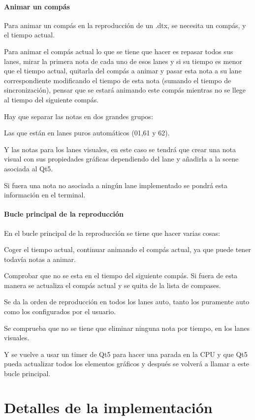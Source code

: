 \documentclass[a4paper,11pt,oneside]{book}
\begin{document}
\subsubsection{Animar un compás}
Para animar un compás en la reproducción de un .dtx, se necesita un compás, y el tiempo actual.

Para animar el compás actual lo que se tiene que hacer es repasar todos sus lanes, mirar la primera nota de cada uno de esos lanes y si su tiempo es menor que el tiempo actual, quitarla del compás a animar y pasar esta nota a su lane correspondiente modificando el tiempo de esta nota (sumando el tiempo de sincronización), pensar que se estará animando este compás mientras no se llege al tiempo del siguiente compás.

Hay que separar las notas en dos grandes grupos:

Las que están en lanes puros automáticos (01,61 y 62).

Y las notas para los lanes visuales, en este caso se tendrá que crear una nota visual con sus propiedades gráficas dependiendo del lane y añadirla a la scene asociada al Qt5.

Si fuera una nota no asociada a ningún lane implementado se pondrá esta información en el terminal.

\subsubsection{Bucle principal de la reproducción}
En el bucle principal de la reproducción se tiene que hacer varias cosas:

Coger el tiempo actual, continuar animando el compás actual, ya que puede tener todavía notas a animar.

Comprobar que no se esta en el tiempo del siguiente compás. Si fuera de esta manera se actualiza el compás actual y se quita de la lista de compases.

Se da la orden de reproducción en todos los lanes auto, tanto los puramente auto como los configurados por el usuario.

Se comprueba que no se tiene que eliminar ninguna nota por tiempo, en los lanes visuales.

Y se vuelve a usar un timer de Qt5 para hacer una parada en la CPU y que Qt5 pueda actualizar todos los elementos gráficos y después se volverá a llamar a este bucle principal.

\chapter{Detalles de la implementación}
\end{document}
